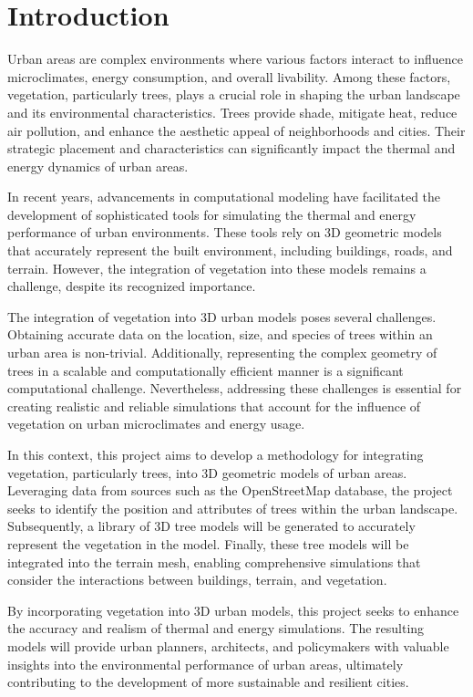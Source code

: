 \documentclass[12pt]{article}
\begin{document}
\newpage

\section{Introduction}
Urban areas are complex environments where various factors interact to influence 
microclimates, energy consumption, and overall livability. Among these factors, 
vegetation, particularly trees, plays a crucial role in shaping the urban landscape 
and its environmental characteristics. Trees provide shade, mitigate heat, reduce 
air pollution, and enhance the aesthetic appeal of neighborhoods and cities. Their 
strategic placement and characteristics can significantly impact the thermal and 
energy dynamics of urban areas.

In recent years, advancements in computational modeling have facilitated the 
development of sophisticated tools for simulating the thermal and energy performance 
of urban environments. These tools rely on 3D geometric models that accurately 
represent the built environment, including buildings, roads, and terrain. However, 
the integration of vegetation into these models remains a challenge, despite its 
recognized importance.

The integration of vegetation into 3D urban models poses several challenges. 
Obtaining accurate data on the location, size, and species of trees within an 
urban area is non-trivial. Additionally, representing the complex geometry of trees 
in a scalable and computationally efficient manner is a significant computational 
challenge. Nevertheless, addressing these challenges is essential for creating 
realistic and reliable simulations that account for the influence of vegetation on 
urban microclimates and energy usage.

In this context, this project aims to develop a methodology for integrating 
vegetation, particularly trees, into 3D geometric models of urban areas. Leveraging 
data from sources such as the OpenStreetMap database, the project seeks to identify 
the position and attributes of trees within the urban landscape. Subsequently, a 
library of 3D tree models will be generated to accurately represent the vegetation 
in the model. Finally, these tree models will be integrated into the terrain mesh, 
enabling comprehensive simulations that consider the interactions between buildings, 
terrain, and vegetation.

By incorporating vegetation into 3D urban models, this project seeks to enhance the 
accuracy and realism of thermal and energy simulations. The resulting models will 
provide urban planners, architects, and policymakers with valuable insights into 
the environmental performance of urban areas, ultimately contributing to the 
development of more sustainable and resilient cities.
\end{document}
